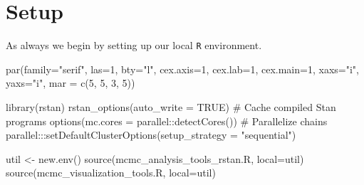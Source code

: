 \documentclass[
  letterpaper,
  DIV=11,
  numbers=noendperiod]{scrartcl}
\newenvironment{Shaded}{\begin{snugshade}}{\end{snugshade}}
\newcommand{\AttributeTok}[1]{\textcolor[rgb]{0.40,0.45,0.13}{#1}}
\newcommand{\CommentTok}[1]{\textcolor[rgb]{0.37,0.37,0.37}{#1}}
\newcommand{\ConstantTok}[1]{\textcolor[rgb]{0.56,0.35,0.01}{#1}}
\newcommand{\DecValTok}[1]{\textcolor[rgb]{0.68,0.00,0.00}{#1}}
\newcommand{\FunctionTok}[1]{\textcolor[rgb]{0.28,0.35,0.67}{#1}}
\newcommand{\NormalTok}[1]{\textcolor[rgb]{0.00,0.23,0.31}{#1}}
\newcommand{\OtherTok}[1]{\textcolor[rgb]{0.00,0.23,0.31}{#1}}
\newcommand{\SpecialCharTok}[1]{\textcolor[rgb]{0.37,0.37,0.37}{#1}}
\newcommand{\StringTok}[1]{\textcolor[rgb]{0.13,0.47,0.30}{#1}}
\begin{document}
\section{Setup}\label{setup}

As always we begin by setting up our local \texttt{R} environment.

\begin{Shaded}
\begin{Highlighting}[]
\FunctionTok{par}\NormalTok{(}\AttributeTok{family=}\StringTok{"serif"}\NormalTok{, }\AttributeTok{las=}\DecValTok{1}\NormalTok{, }\AttributeTok{bty=}\StringTok{"l"}\NormalTok{,}
    \AttributeTok{cex.axis=}\DecValTok{1}\NormalTok{, }\AttributeTok{cex.lab=}\DecValTok{1}\NormalTok{, }\AttributeTok{cex.main=}\DecValTok{1}\NormalTok{,}
    \AttributeTok{xaxs=}\StringTok{"i"}\NormalTok{, }\AttributeTok{yaxs=}\StringTok{"i"}\NormalTok{, }\AttributeTok{mar =} \FunctionTok{c}\NormalTok{(}\DecValTok{5}\NormalTok{, }\DecValTok{5}\NormalTok{, }\DecValTok{3}\NormalTok{, }\DecValTok{5}\NormalTok{))}
\end{Highlighting}
\end{Shaded}

\begin{Shaded}
\begin{Highlighting}[]
\FunctionTok{library}\NormalTok{(rstan)}
\FunctionTok{rstan\_options}\NormalTok{(}\AttributeTok{auto\_write =} \ConstantTok{TRUE}\NormalTok{)            }\CommentTok{\# Cache compiled Stan programs}
\FunctionTok{options}\NormalTok{(}\AttributeTok{mc.cores =}\NormalTok{ parallel}\SpecialCharTok{::}\FunctionTok{detectCores}\NormalTok{()) }\CommentTok{\# Parallelize chains}
\NormalTok{parallel}\SpecialCharTok{:::}\FunctionTok{setDefaultClusterOptions}\NormalTok{(}\AttributeTok{setup\_strategy =} \StringTok{"sequential"}\NormalTok{)}
\end{Highlighting}
\end{Shaded}

\begin{Shaded}
\begin{Highlighting}[]
\NormalTok{util }\OtherTok{\textless{}{-}} \FunctionTok{new.env}\NormalTok{()}
\FunctionTok{source}\NormalTok{(}\StringTok{\textquotesingle{}mcmc\_analysis\_tools\_rstan.R\textquotesingle{}}\NormalTok{, }\AttributeTok{local=}\NormalTok{util)}
\FunctionTok{source}\NormalTok{(}\StringTok{\textquotesingle{}mcmc\_visualization\_tools.R\textquotesingle{}}\NormalTok{, }\AttributeTok{local=}\NormalTok{util)}
\end{Highlighting}
\end{Shaded}
\end{document}
